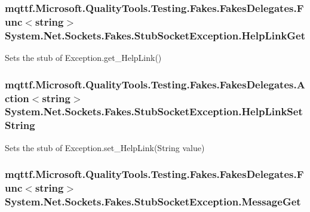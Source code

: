 \hypertarget{class_system_1_1_net_1_1_sockets_1_1_fakes_1_1_stub_socket_exception_ac402d84e699b415cc18dc6d7378a805e}{
\subsubsection[{Help\-Link\-Get}]{\setlength{\rightskip}{0pt plus 5cm}mqttf.\-Microsoft.\-Quality\-Tools.\-Testing.\-Fakes.\-Fakes\-Delegates.\-Func$<$string$>$ System.\-Net.\-Sockets.\-Fakes.\-Stub\-Socket\-Exception.\-Help\-Link\-Get}}\label{class_system_1_1_net_1_1_sockets_1_1_fakes_1_1_stub_socket_exception_ac402d84e699b415cc18dc6d7378a805e}


Sets the stub of Exception.\-get\-\_\-\-Help\-Link()

\hypertarget{class_system_1_1_net_1_1_sockets_1_1_fakes_1_1_stub_socket_exception_a4da75f66d4e68aa244a71e82df00807f}{
\subsubsection[{Help\-Link\-Set\-String}]{\setlength{\rightskip}{0pt plus 5cm}mqttf.\-Microsoft.\-Quality\-Tools.\-Testing.\-Fakes.\-Fakes\-Delegates.\-Action$<$string$>$ System.\-Net.\-Sockets.\-Fakes.\-Stub\-Socket\-Exception.\-Help\-Link\-Set\-String}}\label{class_system_1_1_net_1_1_sockets_1_1_fakes_1_1_stub_socket_exception_a4da75f66d4e68aa244a71e82df00807f}


Sets the stub of Exception.\-set\-\_\-\-Help\-Link(\-String value)

\hypertarget{class_system_1_1_net_1_1_sockets_1_1_fakes_1_1_stub_socket_exception_ae2e89e27b8e9752a7f73ecfb64e8760f}{
\subsubsection[{Message\-Get}]{\setlength{\rightskip}{0pt plus 5cm}mqttf.\-Microsoft.\-Quality\-Tools.\-Testing.\-Fakes.\-Fakes\-Delegates.\-Func$<$string$>$ System.\-Net.\-Sockets.\-Fakes.\-Stub\-Socket\-Exception.\-Message\-Get}}\label{class_system_1_1_net_1_1_sockets_1_1_fakes_1_1_stub_socket_exception_ae2e89e27b8e9752a7f73ecfb64e8760f}


